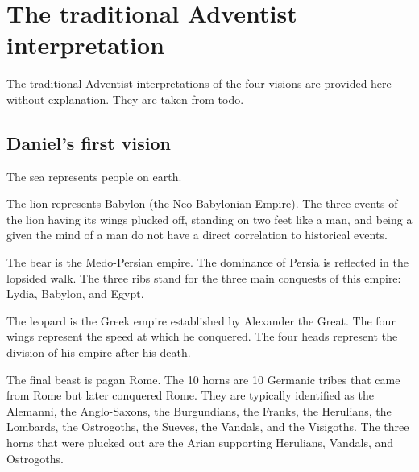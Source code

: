 \section{The traditional Adventist interpretation}
The traditional Adventist interpretations of the four visions are provided here without explanation.
They are taken from todo.

\subsection{Daniel's first vision}

\begin{quote}
\end{quote}
The sea represents people on earth.


\begin{quote}
\end{quote}
The lion represents Babylon (the Neo-Babylonian Empire).
The three events of the lion having its wings plucked off, standing on two feet like a man, and being a given the mind of a man do not have a direct correlation to historical events.


\begin{quote}
\end{quote}
The bear is the Medo-Persian empire. The dominance of Persia is reflected in the lopsided walk. The three ribs stand for the three main conquests of this empire: Lydia, Babylon, and Egypt.


\begin{quote}
\end{quote}
The leopard is the Greek empire established by Alexander the Great. The four wings represent the speed at which he conquered. The four heads represent the division of his empire after his death.


\begin{quote}
\end{quote}
The final beast is pagan Rome. The 10 horns are 10 Germanic tribes that came from Rome but later conquered Rome.
They are typically identified as the Alemanni, the Anglo-Saxons, the Burgundians, the Franks, the Herulians, the Lombards, the Ostrogoths, the Sueves, the Vandals, and the Visigoths.
The three horns that were plucked out are the Arian supporting Herulians, Vandals, and Ostrogoths.



